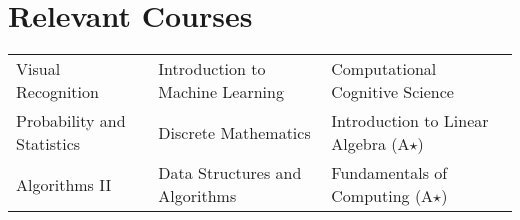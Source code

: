 \section*{Relevant Courses}
\begin{tabularx}{\textwidth}{X X X}
    Visual Recognition &
    Introduction to Machine Learning &
    Computational Cognitive Science \\
    Probability and Statistics &
    Discrete Mathematics &
    Introduction to Linear Algebra (A$\star$) \\
    Algorithms II &
    Data Structures and Algorithms &
    Fundamentals of Computing (A$\star$)
\end{tabularx}
